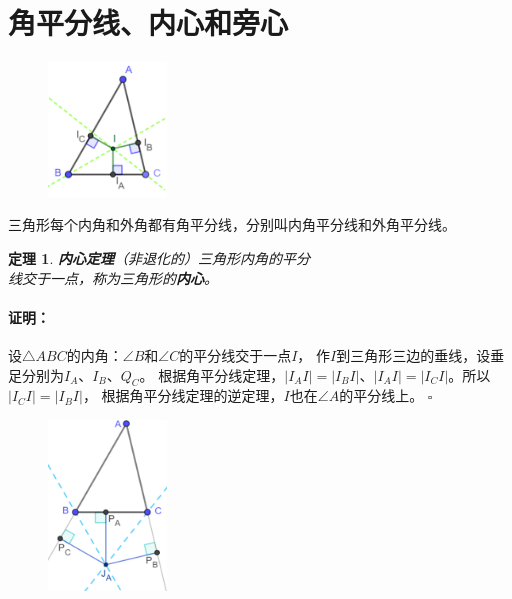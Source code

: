 \documentclass[12pt,UTF8]{ctexbook}
\newtheorem{tm}{定理}[section]
\newenvironment{proof2}{\paragraph{\textbf{证明：}}}{\hfill$\square$}
\begin{document}
\section{角平分线、内心和旁心}

\begin{figure} %
    \vspace{-40pt}
    \flushright
    \includegraphics[width=0.28\textwidth]{三角形内心.png}
\end{figure}

三角形每个内角和外角都有角平分线，分别叫内角平分线和外角平分线。

\begin{tm}{\textbf{内心定理}}\label{tm:1-2-0}
    （非退化的）三角形内角的平分\\
    线交于一点，称为三角形的\textbf{内心}。
\end{tm}

\begin{proof2}
    设$\triangle ABC$的内角：$\angle B$和$\angle C$的平分线交于一点$I$，
    作$I$到三角形三边的垂线，设垂足分别为$I_A$、$I_B$、$Q_C$。
    根据角平分线定理，$|I_AI| = |I_BI|$、$|I_AI| = |I_CI|$。所以$|I_CI| = |I_BI|$，
    根据角平分线定理的逆定理，$I$也在$\angle A$的平分线上。
\end{proof2}

\begin{figure} %
    \vspace{-30pt}
    \flushright
    \includegraphics[width=0.28\textwidth]{三角形旁心.png}
\end{figure}
\end{document}
